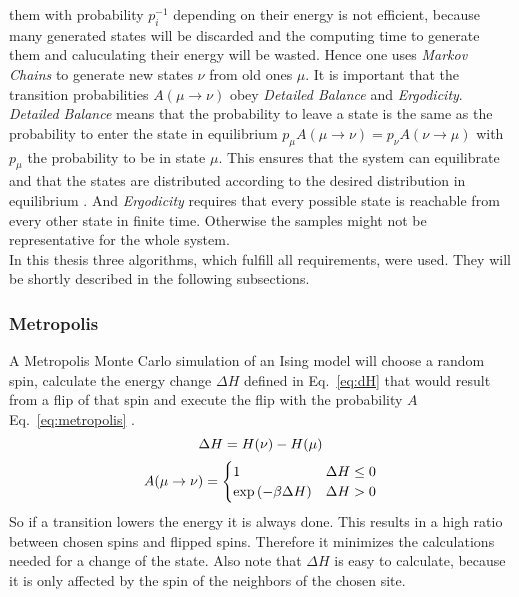     them with probability \(p_i^{-1}\) depending on their energy is not
    efficient, because many generated states will be discarded and the
    computing time to generate them and caluculating their energy will
    be wasted.
    Hence one uses \emph{Markov Chains} to generate new states \(\nu\)
    from old ones \(\mu\). It is important that the transition probabilities
    \(A(\mu \to \nu)\) obey \emph{Detailed Balance} and \emph{Ergodicity}.
    \emph{Detailed Balance} means that the probability to leave a state is
    the same as the probability to enter the state in equilibrium
    \(p_\mu A(\mu \to \nu) = p_\nu A(\nu \to \mu)\) with \(p_\mu\) the
    probability to be in state \(\mu\). This ensures that the system can
    equilibrate and that the states are distributed according to the
    desired distribution in equilibrium \cite{NewmanBarkema1999}.
    And \emph{Ergodicity} requires that every possible state is reachable
    from every other state in finite time. \cite{NewmanBarkema1999} \cite{Katzgraber2011}
    Otherwise the samples might not be representative for the whole system.\\
    In this thesis three algorithms, which fulfill all requirements,
    were used. They will be shortly described in the following subsections.

    \subsubsection{Metropolis}
        A Metropolis Monte Carlo\cite{Metropolis1953} simulation of an
        Ising model will choose a random spin, calculate the energy change
        \(\Delta H\) defined in Eq.\ \eqref{eq:dH} that would result
        from a flip of that spin and execute the flip with the probability \(A\)
        Eq.\ \eqref{eq:metropolis} \cite{NewmanBarkema1999} \cite{Katzgraber2011}.
        \begin{equation}
            \Delta H = H(\nu) - H(\mu)\\
            \label{eq:dH}
        \end{equation}
        \begin{equation}
            A(\mu \to \nu) =
            \begin{cases}
                1                            & \Delta H \le 0 \\
                \exp{\ensuremath{\left(-\beta \Delta H\right)}} & \Delta H > 0
            \end{cases}
            \label{eq:metropolis}
        \end{equation}
        So if a transition lowers the energy it is always done. This
        results in a high ratio between chosen spins and flipped spins.
        Therefore it minimizes the calculations needed for a change of
        the state. Also note that \(\Delta H\) is easy to calculate,
        because it is only affected by the spin of the neighbors of the
        chosen site.

